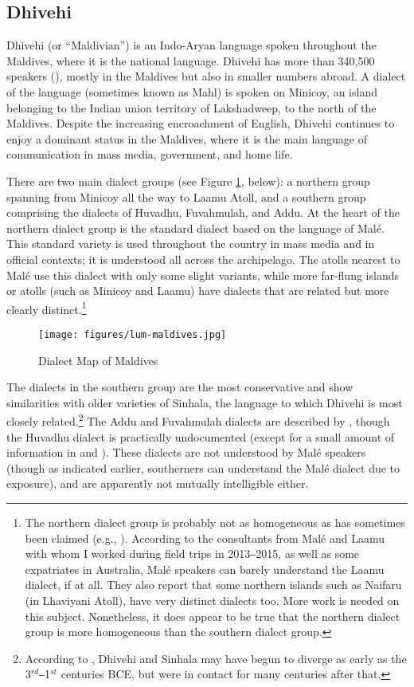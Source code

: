 \documentclass[output=paper]{langsci/langscibook}
\begin{document}
\subsection{Dhivehi}\label{s:jl1-2}

Dhivehi (or “Maldivian”) is an Indo-Aryan language spoken throughout the Maldives, where it is the national language. Dhivehi has more than 340,500 speakers (\citealt{Lewis2014}), mostly in the Maldives but also in smaller numbers abroad. A dialect of the language (sometimes known as Mahl) is spoken on Minicoy, an island belonging to the Indian union territory of Lakshadweep, to the north of the Maldives. Despite the increasing encroachment of English, Dhivehi continues to enjoy a dominant status in the Maldives, where it is the main language of communication in mass media, government, and home life. 

There are two main dialect groups (see Figure \ref{fig:jl1}, below): a northern group spanning from Minicoy all the way to Laamu Atoll, and a southern group comprising the dialects of Huvadhu, Fuvahmulah, and Addu. At the heart of the northern dialect group is the standard dialect based on the language of Malé. This standard variety is used throughout the country in mass media and in official contexts; it is understood all across the archipelago. The atolls nearest to Malé use this dialect with only some slight variants, while more far-flung islands or atolls (such as Minicoy and Laamu) have dialects that are related but more clearly distinct.\footnote{The northern dialect group is probably not as homogeneous as has sometimes been claimed (e.g., \citealt[13]{Fritz2002}). According to the consultants from Malé and Laamu with whom I worked during field trips in 2013‒2015, as well as some expatriates in Australia, Malé speakers can barely understand the Laamu dialect, if at all. They also report that some northern islands such as Naifaru (in Lhaviyani Atoll), have very distinct dialects too. More work is needed on this subject. Nonetheless, it does appear to be true that the northern dialect group is more homogeneous than the southern dialect group.}


\begin{figure}
\texttt{[image: figures/lum-maldives.jpg]}
\caption{Dialect Map of Maldives}
\label{fig:jl1}
\end{figure}

The dialects in the southern group are the most conservative and show similarities with older varieties of Sinhala, the language to which Dhivehi is most closely related.\footnote{According to \cite{Cain2000}, Dhivehi and Sinhala may have begun to diverge as early as the 3$^{rd}$‒1$^{st}$ centuries BCE, but were in contact for many centuries after that.}
The Addu and Fuvahmulah dialects are described by \cite{Fritz2002}, though the Huvadhu dialect is practically undocumented (except for a small amount of information in \citealt{Maumoon2002} and \citealt{Wijesundera1988}). These dialects are not understood by Malé speakers (though as indicated earlier, southerners can understand the Malé dialect due to exposure), and are apparently not mutually intelligible either.
\end{document}
